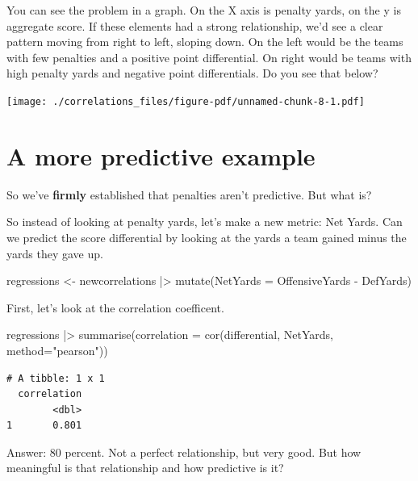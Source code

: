 \documentclass[
  letterpaper,
  DIV=11,
  numbers=noendperiod]{scrreprt}
\newenvironment{Shaded}{\begin{snugshade}}{\end{snugshade}}
\newcommand{\AttributeTok}[1]{\textcolor[rgb]{0.40,0.45,0.13}{#1}}
\newcommand{\FunctionTok}[1]{\textcolor[rgb]{0.28,0.35,0.67}{#1}}
\newcommand{\NormalTok}[1]{\textcolor[rgb]{0.00,0.23,0.31}{#1}}
\newcommand{\OtherTok}[1]{\textcolor[rgb]{0.00,0.23,0.31}{#1}}
\newcommand{\SpecialCharTok}[1]{\textcolor[rgb]{0.37,0.37,0.37}{#1}}
\newcommand{\StringTok}[1]{\textcolor[rgb]{0.13,0.47,0.30}{#1}}
\begin{document}
You can see the problem in a graph. On the X axis is penalty yards, on
the y is aggregate score. If these elements had a strong relationship,
we'd see a clear pattern moving from right to left, sloping down. On the
left would be the teams with few penalties and a positive point
differential. On right would be teams with high penalty yards and
negative point differentials. Do you see that below?

\texttt{[image: ./correlations\_files/figure-pdf/unnamed-chunk-8-1.pdf]}

\hypertarget{a-more-predictive-example}{%
\section{A more predictive example}\label{a-more-predictive-example}}

So we've \textbf{firmly} established that penalties aren't predictive.
But what is?

So instead of looking at penalty yards, let's make a new metric: Net
Yards. Can we predict the score differential by looking at the yards a
team gained minus the yards they gave up.

\begin{Shaded}
\begin{Highlighting}[]
\NormalTok{regressions }\OtherTok{\textless{}{-}}\NormalTok{ newcorrelations }\SpecialCharTok{|\textgreater{}} \FunctionTok{mutate}\NormalTok{(}\AttributeTok{NetYards =}\NormalTok{ OffensiveYards }\SpecialCharTok{{-}}\NormalTok{ DefYards)}
\end{Highlighting}
\end{Shaded}

First, let's look at the correlation coefficent.

\begin{Shaded}
\begin{Highlighting}[]
\NormalTok{regressions }\SpecialCharTok{|\textgreater{}} 
  \FunctionTok{summarise}\NormalTok{(}\AttributeTok{correlation =} \FunctionTok{cor}\NormalTok{(differential, NetYards, }\AttributeTok{method=}\StringTok{"pearson"}\NormalTok{))}
\end{Highlighting}
\end{Shaded}

\begin{verbatim}
# A tibble: 1 x 1
  correlation
        <dbl>
1       0.801
\end{verbatim}

Answer: 80 percent. Not a perfect relationship, but very good. But how
meaningful is that relationship and how predictive is it?
\end{document}
